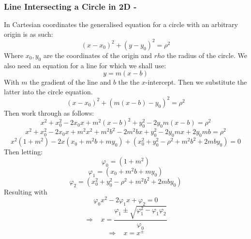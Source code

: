 \documentclass[a4paper,10pt]{article}
\begin{document}
\subsubsection{Line Intersecting a Circle in 2D -}
In Cartesian coordinates the generalised equation for a circle with an arbitrary origin is as such:
\begin{equation}
\left( x - x_0 \right)^2 + \left( y - y_0 \right)^2 = \rho^2
\end{equation}
Where $x_0,y_0$ are the coordinates of the origin and $rho$ the radius of the circle. We also need an equation for a line for which we shall use:
\begin{equation}
y = m(x-b)
\end{equation}
With $m$ the gradient of the line and $b$ the the $x$-intercept. Then we substitute the latter into the circle equation.
\begin{equation}
\left( x - x_0 \right)^2 + \left( m\left( x-b \right) - y_0 \right)^2 = \rho^2
\end{equation}
Then work through as follows:
\begin{equation}
x^2 + x_0^2 - 2 x_0 x + m^2\left( x-b \right)^2 + y_0^2 - 2y_0 m \left( x-b \right) = \rho^2
\end{equation}
\begin{equation}
x^2 + x_0^2 - 2x_0 x + m^2 x^2 + m^2 b^2 - 2m^2 b x + y_0^2 - 2y_0 mx + 2y_0 mb = \rho^2
\end{equation}
\begin{equation}
x^2 \left( 1 + m^2 \right) - 2x\left( x_0 + m^2 b + m y_0 \right) + \left( x_0^2 + y_0^2 - \rho^2 + m^2 b^2 + 2mb y_0 \right) = 0
\end{equation}
Then letting:
\begin{equation}
\varphi_0 = \left( 1 + m^2 \right)
\end{equation}
\begin{equation}
\varphi_1 = \left( x_0 + m^2 b + m y_0 \right)
\end{equation}
\begin{equation}
\varphi_2 = \left( x_0^2 + y_0^2 - \rho^2 + m^2 b^2 + 2mb y_0 \right)
\end{equation}
Resulting with
\begin{equation}
\varphi_0 x^2 - 2 \varphi_1 x + \varphi_2 = 0
\end{equation}
\begin{equation}
\Rightarrow \ \ \ \ x = \frac{\varphi_1 \pm \sqrt{\varphi_1^2 - \varphi_1 \varphi_2}}{\varphi_0}
\end{equation}
\begin{equation}
\Rightarrow \ \ \ \ x = x^\pm
\end{equation}
\end{document}
